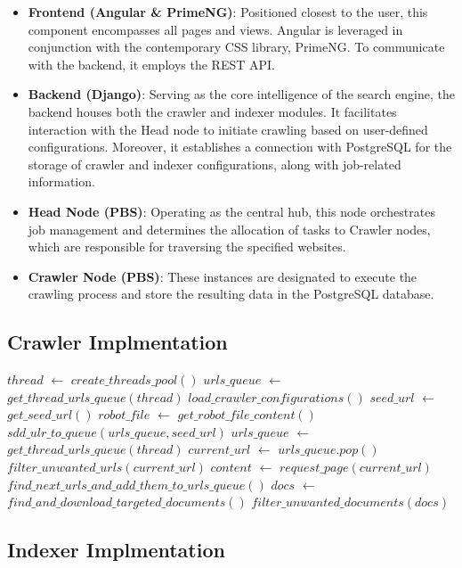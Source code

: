 \begin{itemize}
  \item \textbf{Frontend (Angular \& PrimeNG)}: Positioned closest to the user, this component encompasses all pages and views. Angular is leveraged in conjunction with the contemporary CSS library, PrimeNG. To communicate with the backend, it employs the REST API.
  \item \textbf{Backend (Django)}: Serving as the core intelligence of the search engine, the backend houses both the crawler and indexer modules. It facilitates interaction with the Head node to initiate crawling based on user-defined configurations. Moreover, it establishes a connection with PostgreSQL for the storage of crawler and indexer configurations, along with job-related information.
  \item \textbf{Head Node (PBS)}: Operating as the central hub, this node orchestrates job management and determines the allocation of tasks to Crawler nodes, which are responsible for traversing the specified websites.
  \item \textbf{Crawler Node (PBS)}: These instances are designated to execute the crawling process and store the resulting data in the PostgreSQL database.
\end{itemize}


\subsection{Crawler Implmentation}
\begin{algorithm}[H]
	\caption{$Start Crawling$}\label{alg:alg1}
	\begin{algorithmic}
		\State $thread$ $\gets$ $create\_threads\_pool()$
	    \State $urls\_queue$ $\gets$ $get\_thread\_urls\_queue(thread)$
	    \State $load\_crawler\_configurations()$
	    \State $seed\_url$ $\gets$ $get\_seed\_url()$
	    \State $robot\_file$ $\gets$ $get\_robot\_file\_content()$
	    \State $sdd\_ulr\_to\_queue(urls\_queue, seed\_url)$
		    \State $urls\_queue$ $\gets$ $get\_thread\_urls\_queue(thread)$
		\Else
			\State $current\_url$ $\gets$ $urls\_queue.pop()$
			\State $filter\_unwanted\_urls(current\_url)$
			\State $content$ $\gets$ $request\_page(current\_url)$
			\State $find\_next\_urls\_and\_add\_them\_to\_urls\_queue()$
			\State $docs$ $\gets$ $find\_and\_download\_targeted\_documents()$
			\State $filter\_unwanted\_documents(docs)$
		\EndIf
		\EndWhile

	\end{algorithmic}
\end{algorithm}

\subsection{Indexer Implmentation}